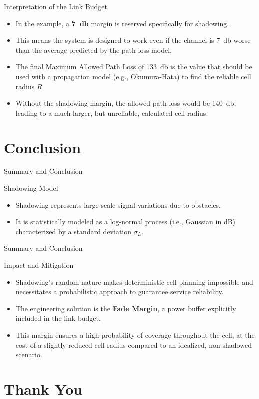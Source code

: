 \documentclass{beamer}
\begin{document}
	\begin{frame}{Interpretation of the Link Budget}
		\begin{itemize}
			\item In the example, a \textbf{\SI{7}{\decibel}} margin is reserved specifically for shadowing.
			\item This means the system is designed to work even if the channel is \SI{7}{\decibel} worse than the average predicted by the path loss model.
			\item The final Maximum Allowed Path Loss of \SI{133}{\decibel} is the value that should be used with a propagation model (e.g., Okumura-Hata) to find the reliable cell radius $R$.
			\item Without the shadowing margin, the allowed path loss would be \SI{140}{\decibel}, leading to a much larger, but unreliable, calculated cell radius.
		\end{itemize}
	\end{frame}
	
	\section{Conclusion}
	
	\begin{frame}{Summary and Conclusion}
		\begin{block}{Shadowing Model}
			\begin{itemize}
				\item Shadowing represents large-scale signal variations due to obstacles.
				\item It is statistically modeled as a log-normal process (i.e., Gaussian in dB) characterized by a standard deviation $\sigma_L$.
			\end{itemize}
		\end{block}
		
	\end{frame}
	
	\begin{frame}{Summary and Conclusion}
		\begin{alertblock}{Impact and Mitigation}
			\begin{itemize}
				\item Shadowing's random nature makes deterministic cell planning impossible and necessitates a probabilistic approach to guarantee service reliability.
				\item The engineering solution is the \textbf{Fade Margin}, a power buffer explicitly included in the link budget.
				\item This margin ensures a high probability of coverage throughout the cell, at the cost of a slightly reduced cell radius compared to an idealized, non-shadowed scenario.
			\end{itemize}
		\end{alertblock}
	\end{frame}
	
	\section{Thank You}
\end{document}
